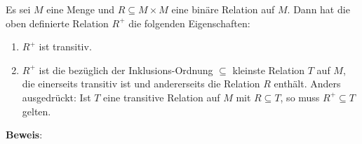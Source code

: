 \begin{Satz}
Es sei $M$ eine Menge und $R \subseteq M \times M$ eine bin\"{a}re Relation auf $M$.
Dann hat die oben definierte Relation $R^+$ die folgenden Eigenschaften:
\begin{enumerate}
\item $R^+$ ist transitiv.
\item $R^+$   ist die bez\"{u}glich der Inklusions-Ordnung $\subseteq$ kleinste Relation
      $T$ auf $M$, die einerseits transitiv ist und andererseits die Relation $R$ enth\"{a}lt.
      Anders ausgedr\"{u}ckt: Ist $T$ eine transitive Relation auf $M$ mit $R \subseteq T$, so
      muss $R^+ \subseteq T$ gelten.
\end{enumerate}
\end{Satz}

\noindent
\textbf{Beweis}:
